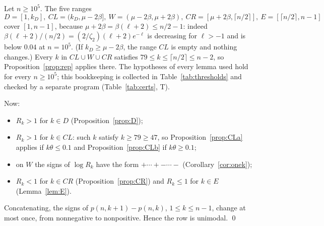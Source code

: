 \documentclass[11pt]{amsart}
\theoremstyle{definition}
\theoremstyle{remark}
\numberwithin{equation}{section}
\begin{document}
Let $n\ge10^5$. The five ranges
\[
  D=[1,k_D],\ CL=(k_D,\mu-2\beta],\ W=(\mu-2\beta,\mu+2\beta),\ CR=[\mu+2\beta,\lceil n/2\rceil],\ E=[\lceil n/2\rceil,n-1]
\]
cover $[1,n-1]$, because $\mu+2\beta=\beta(\ell+2)\le n/2-1$: indeed $\beta(\ell+2)/(n/2)=(2/\zeta_2)(\ell+2)e^{-\ell}$ is decreasing for
$\ell>-1$ and is below $0.04$ at $n=10^5$. (If $k_D\ge\mu-2\beta$, the range $CL$ is empty and nothing changes.) Every $k$ in $CL\cup W\cup CR$
satisfies $79\le k\le\lceil n/2\rceil\le n-2$, so Proposition~\ref{prop:rep} applies there. The hypotheses of every lemma used hold for every
$n\ge10^5$; this bookkeeping is collected in Table~\ref{tab:thresholds} and checked by a separate program (Table~\ref{tab:certs}, T).

Now:
\begin{itemize}
\item $R_k>1$ for $k\in D$ (Proposition~\ref{prop:D});
\item $R_k>1$ for $k\in CL$: such $k$ satisfy $k\ge79\ge47$, so Proposition~\ref{prop:CLa} applies if $k\theta\le0.1$ and
  Proposition~\ref{prop:CLb} if $k\theta\ge0.1$;
\item on $W$ the signs of $\log R_k$ have the form $+\cdots+-\cdots-$ (Corollary~\ref{cor:onek});
\item $R_k<1$ for $k\in CR$ (Proposition~\ref{prop:CR}) and $R_k\le1$ for $k\in E$ (Lemma~\ref{lem:E}).
\end{itemize}
Concatenating, the signs of $p(n,k+1)-p(n,k)$, $1\le k\le n-1$, change at most once, from nonnegative to nonpositive. Hence the row is
unimodal. \qed
\end{document}
